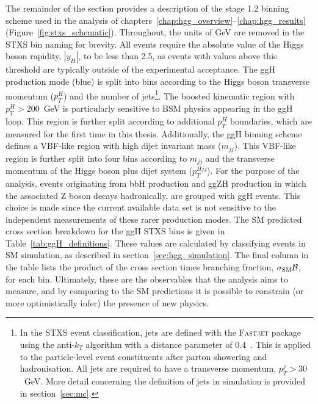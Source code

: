 The remainder of the section provides a description of the stage 1.2 binning scheme used in the \Hgg analysis of chapters~\ref{chap:hgg_overview}--\ref{chap:hgg_results} (Figure~\ref{fig:stxs_schematic}). Throughout, the units of GeV are removed in the STXS bin naming for brevity. All events require the absolute value of the Higgs boson rapidity, $|y_H|$, to be less than 2.5, as events with values above this threshold are typically outside of the experimental acceptance. The ggH production mode (blue) is split into bins according to the Higgs boson transverse momentum ($p_T^H$) and the number of jets\footnote{In the STXS event classification, jets are defined with the \textsc{Fastjet} package~\cite{Cacciari:2011ma} using the anti-$k_T$ algorithm with a distance parameter of 0.4~\cite{Cacciari:2008gp}. This is applied to the particle-level event constituents after parton showering and hadronisation. All jets are required to have a transverse momentum, $p_T^j>30$~GeV. More detail concerning the definition of jets in simulation is provided in section~\ref{sec:mc}.}. The boosted kinematic region with $p_T^H>200$~GeV is particularly sensitive to BSM physics appearing in the ggH loop. This region is further split according to additional $p_T^H$ boundaries, which are measured for the first time in this thesis. Additionally, the ggH binning scheme defines a VBF-like region with high dijet invariant mass ($m_{jj}$). This VBF-like region is further split into four bins according to $m_{jj}$ and the transverse momentum of the Higgs boson plus dijet system ($p_T^{Hjj}$). For the purpose of the \Hgg analysis, events originating from bbH production and ggZH production in which the associated Z boson decays hadronically, are grouped with ggH events. This choice is made since the current available data set is not sensitive to the independent measurements of these rarer production modes. The SM predicted cross section breakdown for the ggH STXS bins is given in Table~\ref{tab:ggH_definitions}. These values are calculated by classifying events in SM simulation, as described in section~\ref{sec:hgg_simulation}. The final column in the table lists the product of the cross section times \Hgg branching fraction, $\sigma_{\rm{SM}}\mathcal{B}$, for each bin. Ultimately, these are the observables that the \Hgg analysis aims to measure, and by comparing to the SM predictions it is possible to constrain (or more optimistically infer) the presence of new physics.

